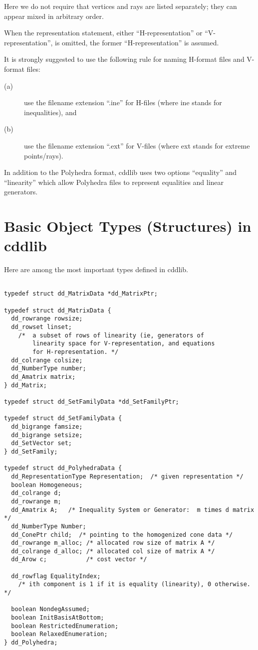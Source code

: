 \documentclass[11pt]{article}
\begin{document}
\bigskip
\noindent
Here we do not require that
vertices and rays are listed
separately; they can appear mixed in arbitrary
order.

When the representation statement, either ``H-representation''
or ``V-representation'', is omitted, the former
``H-representation'' is assumed.


It is strongly suggested to use the following rule for naming
H-format files and V-format files:   
\begin{description}
\item[(a)] use the filename  extension ``.ine'' for H-files (where ine stands for inequalities), and 
\item[(b)]  use the filename  extension ``.ext'' for V-files (where ext stands for extreme points/rays). 
\end{description}

In addition to the Polyhedra format, cddlib uses two options ``equality''
and ``linearity'' which allow Polyhedra files to represent equalities
and linear generators.

\section{Basic Object Types (Structures) in cddlib}  \label{DATASTR}

Here are among the most important types defined in cddlib.

\begin{verbatim}

typedef struct dd_MatrixData *dd_MatrixPtr;

typedef struct dd_MatrixData {
  dd_rowrange rowsize;
  dd_rowset linset; 
    /*  a subset of rows of linearity (ie, generators of
        linearity space for V-representation, and equations
        for H-representation. */
  dd_colrange colsize;
  dd_NumberType number;
  dd_Amatrix matrix;  
} dd_Matrix;

typedef struct dd_SetFamilyData *dd_SetFamilyPtr;

typedef struct dd_SetFamilyData {
  dd_bigrange famsize;
  dd_bigrange setsize;
  dd_SetVector set;  
} dd_SetFamily;

typedef struct dd_PolyhedraData {
  dd_RepresentationType Representation;  /* given representation */
  boolean Homogeneous;
  dd_colrange d;
  dd_rowrange m;
  dd_Amatrix A;   /* Inequality System or Generator:  m times d matrix */
  dd_NumberType Number;
  dd_ConePtr child;  /* pointing to the homogenized cone data */
  dd_rowrange m_alloc; /* allocated row size of matrix A */
  dd_colrange d_alloc; /* allocated col size of matrix A */
  dd_Arow c;           /* cost vector */

  dd_rowflag EqualityIndex;  
    /* ith component is 1 if it is equality (linearity), 0 otherwise. */

  boolean NondegAssumed;
  boolean InitBasisAtBottom;
  boolean RestrictedEnumeration;
  boolean RelaxedEnumeration;
} dd_Polyhedra;

\end{verbatim}
\end{document}
